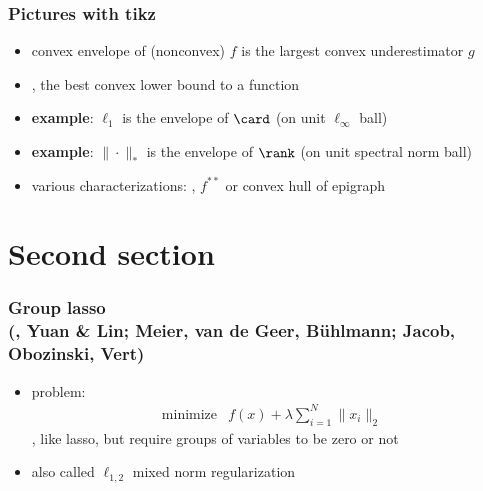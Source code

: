 \documentclass[10pt,mathserif]{beamer}
\begin{document}
\begin{frame}
\frametitle{Pictures with tikz}
\begin{itemize}\itemsep=12pt
	\item convex envelope of (nonconvex) $f$ is the largest convex underestimator $g$
    \item \ie, the best convex lower bound to a function
        \vspace*{1em}
\begin{center}
\end{center}
    \item \textbf{example}: $\ell_1$ is the envelope of $\card$ (on unit $\ell_\infty$ ball)
    \item \textbf{example}: $\|\cdot\|_*$ is the envelope of $\rank$ (on unit spectral norm ball)
    \item various characterizations: \eg, $f^{**}$ or convex hull of epigraph
\end{itemize}
\end{frame}

\section{Second section}

\begin{frame}
\frametitle{Group lasso \\[-0.3em] 
{\footnotesize \textmd{(\eg, Yuan \& Lin; Meier, van de Geer, B\"uhlmann; Jacob, Obozinski, Vert)}}}
\begin{itemize}\itemsep=12pt
\item problem:
\[
\begin{array}{ll}
\mbox{minimize} & f(x) + \lambda \sum_{i=1}^N \|x_i\|_2
\end{array}
\]
\ie, like lasso, but require groups of variables to be zero or not
\item also called $\ell_{1,2}$ mixed norm regularization
\end{itemize}
\end{frame}
\end{document}
